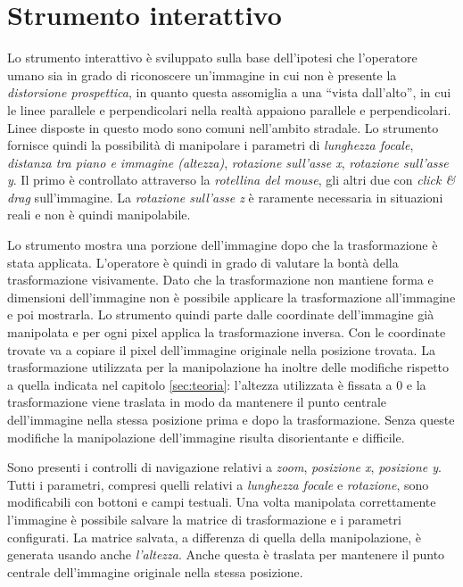\section{Strumento interattivo}
Lo strumento interattivo è sviluppato sulla base dell'ipotesi che l'operatore umano sia in grado di riconoscere un'immagine in cui non è presente la \emph{distorsione prospettica}, in quanto questa assomiglia a una ``vista dall'alto'', in cui le linee parallele e perpendicolari nella realtà appaiono parallele e perpendicolari. 
Linee disposte in questo modo sono comuni nell'ambito stradale.
Lo strumento fornisce quindi la possibilità di manipolare i parametri di \emph{lunghezza focale}, \emph{distanza tra piano e immagine (altezza)}, \emph{rotazione sull'asse x}, \emph{rotazione sull'asse y}.
Il primo è controllato attraverso la \emph{rotellina del mouse}, gli altri due con \emph{click \& drag} sull'immagine.
La \emph{rotazione sull'asse z} è raramente necessaria in situazioni reali e non è quindi manipolabile.

Lo strumento mostra una porzione dell'immagine dopo che la trasformazione è stata applicata.
L'operatore è quindi in grado di valutare la bontà della trasformazione visivamente.
Dato che la trasformazione non mantiene forma e dimensioni dell'immagine non è possibile applicare la trasformazione all'immagine e poi mostrarla.
Lo strumento quindi parte dalle coordinate dell'immagine già manipolata e per ogni pixel applica la trasformazione inversa.
Con le coordinate trovate va a copiare il pixel dell'immagine originale nella posizione trovata.
La trasformazione utilizzata per la manipolazione ha inoltre delle modifiche rispetto a quella indicata nel capitolo \ref{sec:teoria}: l'altezza utilizzata è fissata a 0 e la trasformazione viene traslata in modo da mantenere il punto centrale dell'immagine nella stessa posizione prima e dopo la trasformazione.
Senza queste modifiche la manipolazione dell'immagine risulta disorientante e difficile.

Sono presenti i controlli di navigazione relativi a \emph{zoom}, \emph{posizione x}, \emph{posizione y}.
Tutti i parametri, compresi quelli relativi a \emph{lunghezza focale} e \emph{rotazione}, sono modificabili con bottoni e campi testuali.
Una volta manipolata correttamente l'immagine è possibile salvare la matrice di trasformazione e i parametri configurati.
La matrice salvata, a differenza di quella della manipolazione, è generata usando anche \emph{l'altezza}.
Anche questa è traslata per mantenere il punto centrale dell'immagine originale nella stessa posizione.

